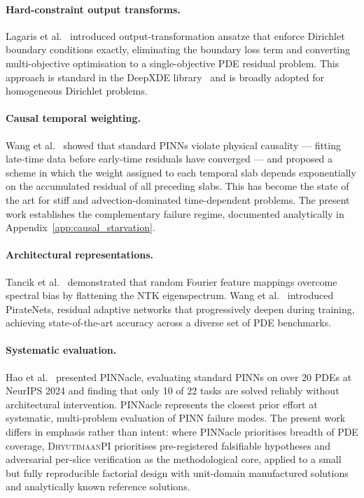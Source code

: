 \documentclass{article}
\newcommand{\dhyutimaan}{\textsc{DhyutimaanPI}}
\begin{document}
\paragraph{Hard-constraint output transforms.}
Lagaris et al.~\citep{lagaris1998} introduced output-transformation ansatze
that enforce Dirichlet boundary conditions exactly, eliminating the boundary
loss term and converting multi-objective optimisation to a single-objective
PDE residual problem.
This approach is standard in the DeepXDE library~\citep{lu2021deepxde} and is
broadly adopted for homogeneous Dirichlet problems.

\paragraph{Causal temporal weighting.}
Wang et al.~\citep{wang2022causal} showed that standard PINNs violate physical
causality — fitting late-time data before early-time residuals have converged
— and proposed a scheme in which the weight assigned to each temporal slab
depends exponentially on the accumulated residual of all preceding slabs.
This has become the state of the art for stiff and advection-dominated
time-dependent problems.
The present work establishes the complementary failure regime, documented
analytically in Appendix~\ref{app:causal_starvation}.

\paragraph{Architectural representations.}
Tancik et al.~\citep{tancik2020ff} demonstrated that random Fourier feature
mappings overcome spectral bias by flattening the NTK eigenspectrum.
Wang et al.~\citep{wang2024pirate} introduced PirateNets, residual adaptive
networks that progressively deepen during training, achieving state-of-the-art
accuracy across a diverse set of PDE benchmarks.

\paragraph{Systematic evaluation.}
Hao et al.~\citep{pinnacle2024} presented PINNacle, evaluating standard PINNs
on over 20 PDEs at NeurIPS 2024 and finding that only 10 of 22 tasks are
solved reliably without architectural intervention.
PINNacle represents the closest prior effort at systematic, multi-problem
evaluation of PINN failure modes.
The present work differs in emphasis rather than intent: where PINNacle
prioritises breadth of PDE coverage, \dhyutimaan{} prioritises pre-registered
falsifiable hypotheses and adversarial per-slice verification as the
methodological core, applied to a small but fully reproducible factorial design
with unit-domain manufactured solutions and analytically known reference solutions.
\end{document}
